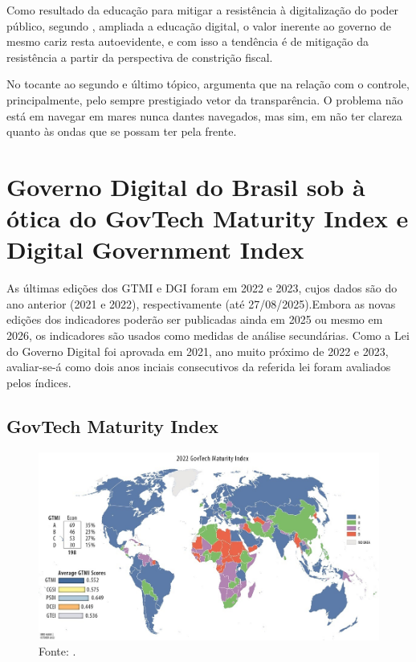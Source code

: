 Como resultado da educação para mitigar a resistência à digitalização do poder público, segundo \cite{do2022governo}, ampliada a educação digital, o valor inerente ao governo de mesmo cariz resta autoevidente, e com isso a tendência é de mitigação da resistência a partir da perspectiva de constrição fiscal.

No tocante ao segundo e último tópico, \cite{do2022governo} argumenta que na relação com o controle, principalmente, pelo sempre prestigiado vetor da transparência. O problema não está em navegar em mares nunca dantes navegados, mas sim, em não ter clareza quanto às ondas que se possam ter pela frente.

\section{Governo Digital do Brasil sob à ótica do GovTech Maturity Index e Digital Government Index}

As últimas edições dos GTMI e DGI foram em 2022 e 2023, cujos dados são do ano anterior (2021 e 2022), respectivamente (até 27/08/2025).Embora as novas edições dos indicadores poderão ser publicadas ainda em 2025 ou mesmo em 2026, os indicadores são usados como medidas de análise secundárias. Como a Lei do Governo Digital foi aprovada em 2021, ano muito próximo de 2022 e 2023, avaliar-se-á como dois anos inciais consecutivos da referida lei foram avaliados pelos índices.

\subsection{GovTech Maturity Index}

\begin{figure}[H]
	\centering
	\caption{}
	\includegraphics[width=1\linewidth]{figuras/gtmi_2022_survey_map}
	\label{fig:gtmi_2022_survey_map}
	\footnotesize{Fonte: \cite{}.}
\end{figure}

